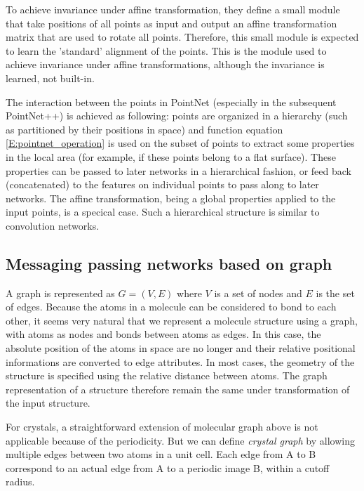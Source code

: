 \documentclass{IEEEtran}
\begin{document}
To achieve invariance under affine transformation, they define a small module that take positions 
of all points as input and output an affine transformation matrix that are used to rotate all points. 
Therefore, this small module is expected to learn the 'standard' alignment of the points. This is 
the module used to achieve invariance under affine transformations, although the invariance is learned, 
not built-in. 

The interaction between the points in PointNet (especially in the subsequent PointNet++\cite{qi_pointnet_2017-1}) 
is achieved as following: points are organized in a hierarchy 
(such as partitioned by their positions in space) and function equation \eqref{E:pointnet_operation}
is used on the subset of points to extract some properties in the local area (for example, if these 
points belong to a flat surface). These properties can be passed to later networks in a hierarchical
fashion, or feed back (concatenated) to the features on individual points to pass along to later 
networks.
The affine transformation, being a global properties applied to the input points, is a specical case. 
Such a hierarchical structure is similar to convolution networks.

\subsection{Messaging passing networks based on graph}

A graph is represented as $G = (V,E)$ where $V$ is a set of nodes and $E$ is the set of edges\cite{wu_comprehensive_2021}.
Because the atoms in a molecule can be considered to bond to each other, it seems very natural that we 
represent a molecule structure using a graph, with atoms as nodes and bonds between atoms as edges. 
In this case, the absolute position of the atoms in space are no longer and their relative positional 
informations are converted to edge attributes. 
In most cases, the geometry of the structure is specified using the relative distance between atoms. 
The graph representation of a structure therefore remain the same under transformation of the input 
structure.

For crystals, a straightforward extension of molecular graph above is not applicable because of the periodicity. 
But we can define \emph{crystal graph} by allowing multiple edges between two atoms in a unit cell. 
Each edge from A to B correspond to an actual edge from A to a periodic image B, within a cutoff 
radius. 
\end{document}

